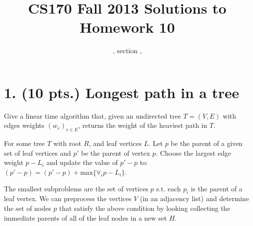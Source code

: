 \documentclass[11pt]{article}
\title{CS170  Fall 2013 Solutions to Homework 10}
\author{\Name, section \Sec, \texttt{\Login}}
\begin{document}
\maketitle

\section*{1. (10 pts.) Longest path in a tree}

Give a linear time algorithm that, given an undirected tree $T = (V,E)$ with edges weights
$(w_e)_{e \in E}$, returns the weight of the heaviest path in $T$.



For some tree $T$ with root $R$, and leaf vertices $L$. Let $p$ be the parent 
of a given set of leaf vertices and $p'$ be the parent of vertex $p$.
Choose the largest edge weight $p-L_i$ and update the value of 
$p'-p$ to: $(p'-p)=(p'-p)+\mbox{max}\{\forall_i p-L_i\}$. 

The smallest subproblems are the set of vertices $p$ s.t. each $p_i$ is 
the parent of a leaf vertex. We can preprocess the vertices $V$ (in an adjacency
list) and determine the set of nodes $p$ that satisfy the above 
condition by looking collecting the immediate parents of all of the leaf
nodes in a new set $H$. 
\end{document}
